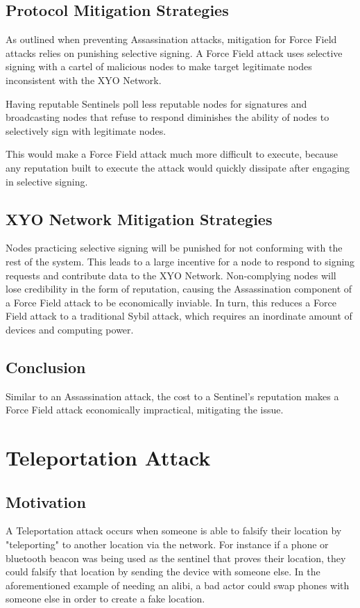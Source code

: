 \documentclass{article}
\begin{document}
\subsection{Protocol Mitigation Strategies}

As outlined when preventing Assassination attacks, mitigation for Force Field attacks relies on punishing selective signing. A Force Field attack uses selective signing with a cartel of malicious nodes to make target legitimate nodes inconsistent with the XYO Network. 

Having reputable Sentinels poll less reputable nodes for signatures and broadcasting nodes that refuse to respond diminishes the ability of nodes to selectively sign with legitimate nodes.

This would make a Force Field attack much more difficult to execute, because any reputation built to execute the attack would quickly dissipate after engaging in selective signing.

\subsection{XYO Network Mitigation Strategies}

Nodes practicing selective signing will be punished for not conforming with the rest of the system. This leads to a large incentive for a node to respond to signing requests and contribute data to the XYO Network. Non-complying nodes will lose credibility in the form of reputation, causing the Assassination component of a Force Field attack to be economically inviable. In turn, this reduces a Force Field attack to a traditional Sybil attack, which requires an inordinate amount of devices and computing power.

\subsection{Conclusion}

Similar to an Assassination attack, the cost to a Sentinel's reputation makes a Force Field attack economically impractical, mitigating the issue.

\section{Teleportation Attack}
\subsection{Motivation}
A Teleportation attack occurs when someone is able to falsify their location by "teleporting" to another location via the network. For instance if a phone or bluetooth beacon was being used as the sentinel that proves their location, they could falsify that location by sending the device with someone else. In the aforementioned example of needing an alibi, a bad actor could swap phones with someone else in order to create a fake location. 
\end{document}
